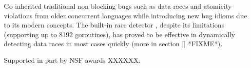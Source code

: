 
Go inherited traditional non-blocking bugs such as data races and atomicity violations from older concurrent languages while introducing new bug idioms due to its modern concepts.  The built-in race detector \cite{go-race-blog}, despite its limitations (\eg supporting up to 8192 goroutines), has proved to be effective in dynamically detecting data races in most cases quickly (more in section \ref{} *FIXME*).



 Supported in part by
NSF awards XXXXXX.

